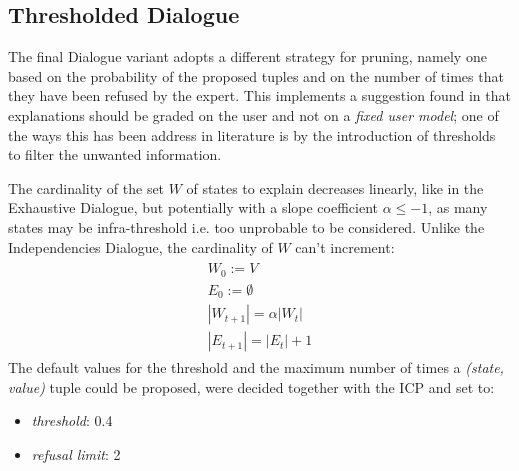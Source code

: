 \subsection{Thresholded Dialogue}
The final Dialogue variant adopts a different strategy for pruning, namely one based on the probability of the proposed tuples and on the number of times that they have been refused by the expert.
This implements a suggestion found in \citet{lacave2002review} that explanations should be graded on the user and not on a \textit{fixed user model}; one of the ways this has been address in literature is by the introduction of thresholds to filter the unwanted information.

The cardinality of the set $W$ of states to explain decreases linearly, like in the Exhaustive Dialogue, but potentially with a slope coefficient $\alpha \leq -1$, as many states may be infra-threshold i.e. too unprobable to be considered.
Unlike the Independencies Dialogue, the cardinality of $W$ can't increment:
\begin{align}
\begin{split}
	W_0 := V \\
	E_0 := \emptyset \\
	|W_{t+1}| = \alpha |W_t| \\
	|E_{t+1}| = |E_t| + 1
\end{split}
\end{align}
The default values for the threshold and the maximum number of times a \textit{(state, value)} tuple could be proposed, were decided together with the ICP and set to:
\begin{itemize}
  \item \textit{threshold}: 0.4
  \item \textit{refusal limit}: 2
\end{itemize}